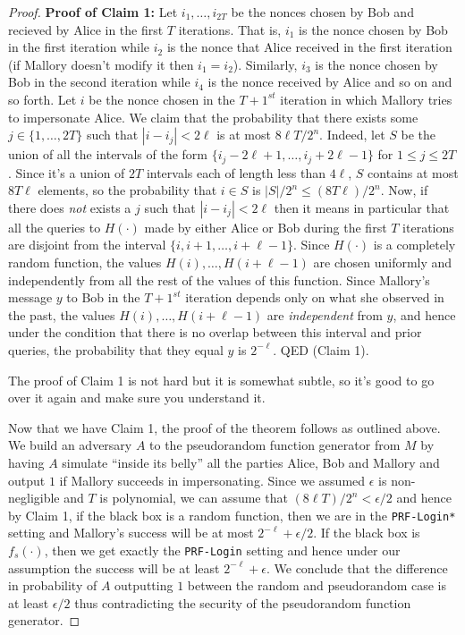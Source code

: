 \begin{proof}
\textbf{Proof of Claim 1:} Let \(i_1,\ldots,i_{2T}\) be the nonces
chosen by Bob and recieved by Alice in the first \(T\) iterations. That
is, \(i_1\) is the nonce chosen by Bob in the first iteration while
\(i_2\) is the nonce that Alice received in the first iteration (if
Mallory doesn't modify it then \(i_1=i_2\)). Similarly, \(i_3\) is the
nonce chosen by Bob in the second iteration while \(i_4\) is the nonce
received by Alice and so on and so forth. Let \(i\) be the nonce chosen
in the \(T+1^{st}\) iteration in which Mallory tries to impersonate
Alice. We claim that the probability that there exists some
\(j\in\{1,\ldots,2T\}\) such that \(|i-i_j|<2\ell\) is at most
\(8\ell T/2^n\). Indeed, let \(S\) be the union of all the intervals of
the form \(\{ i_j-2\ell+1,\ldots, i_j+2\ell-1 \}\) for
\(1 \leq j \leq 2T\). Since it's a union of \(2T\) intervals each of
length less than \(4\ell\), \(S\) contains at most \(8T\ell\) elements,
so the probability that \(i\in S\) is \(|S|/2^n \leq (8T\ell)/2^n\).
Now, if there does \emph{not} exists a \(j\) such that \(|i-i_j|<2\ell\)
then it means in particular that all the queries to \(H(\cdot)\) made by
either Alice or Bob during the first \(T\) iterations are disjoint from
the interval \(\{ i,i+1,\ldots,i+\ell-1 \}\). Since \(H(\cdot)\) is a
completely random function, the values \(H(i),\ldots,H(i+\ell-1)\) are
chosen uniformly and independently from all the rest of the values of
this function. Since Mallory's message \(y\) to Bob in the \(T+1^{st}\)
iteration depends only on what she observed in the past, the values
\(H(i),\ldots,H(i+\ell-1)\) are \emph{independent} from \(y\), and hence
under the condition that there is no overlap between this interval and
prior queries, the probability that they equal \(y\) is \(2^{-\ell}\).
QED (Claim 1).

The proof of Claim 1 is not hard but it is somewhat subtle, so it's good
to go over it again and make sure you understand it.

Now that we have Claim 1, the proof of the theorem follows as outlined
above. We build an adversary \(A\) to the pseudorandom function
generator from \(M\) by having \(A\) simulate ``inside its belly'' all
the parties Alice, Bob and Mallory and output \(1\) if Mallory succeeds
in impersonating. Since we assumed \(\epsilon\) is non-negligible and
\(T\) is polynomial, we can assume that \((8\ell T)/2^n < \epsilon/2\)
and hence by Claim 1, if the black box is a random function, then we are
in the \texttt{PRF-Login*} setting and Mallory's success will be at most
\(2^{-\ell}+\epsilon/2\). If the black box is \(f_s(\cdot)\), then we
get exactly the \texttt{PRF-Login} setting and hence under our
assumption the success will be at least \(2^{-\ell}+\epsilon\). We
conclude that the difference in probability of \(A\) outputting \(1\)
between the random and pseudorandom case is at least \(\epsilon/2\) thus
contradicting the security of the pseudorandom function generator.

\end{proof}


